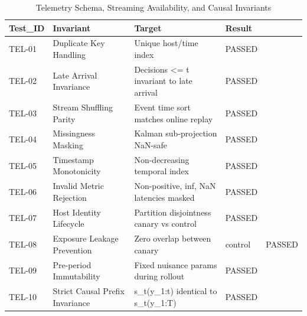\begin{table}[htbp]
\centering
\caption{Telemetry Schema, Streaming Availability, and Causal Invariants}
\label{tab:table_T4_telemetry_invariants}
\begin{tabular}{llll}
\hline
Test\_ID & Invariant & Target & Result \\
\hline
TEL-01 & Duplicate Key Handling & Unique host/time index & PASSED \\
TEL-02 & Late Arrival Invariance & Decisions <= t invariant to late arrival & PASSED \\
TEL-03 & Stream Shuffling Parity & Event time sort matches online replay & PASSED \\
TEL-04 & Missingness Masking & Kalman sub-projection NaN-safe & PASSED \\
TEL-05 & Timestamp Monotonicity & Non-decreasing temporal index & PASSED \\
TEL-06 & Invalid Metric Rejection & Non-positive, inf, NaN latencies masked & PASSED \\
TEL-07 & Host Identity Lifecycle & Partition disjointness canary vs control & PASSED \\
TEL-08 & Exposure Leakage Prevention & Zero overlap between canary & control & PASSED \\
TEL-09 & Pre-period Immutability & Fixed nuisance params during rollout & PASSED \\
TEL-10 & Strict Causal Prefix Invariance & s\_t(y\_1:t) identical to s\_t(y\_1:T) & PASSED \\
\hline
\end{tabular}
\end{table}
